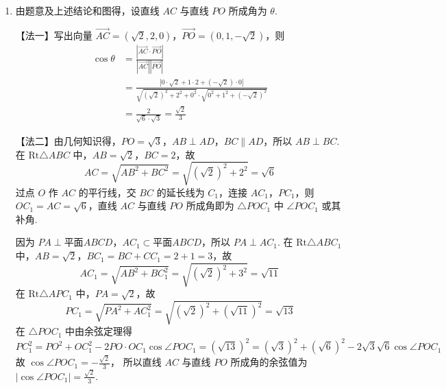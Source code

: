 \documentclass[UTF8,a4paper,oneside,11pt]{ctexbook}
\begin{document}
\begin{solution}
\begin{enumerate}
\begin{enumerate}
由几何知识得
\(O_1E = AB = \sqrt{2}\)，\(BE = CE = AO_1 = \frac{1}{2} BC = 1\)，\(O_1D = AD - AO_1 = \sqrt{3}\)，
并且
\(BO_1 = CO_1 = \sqrt{1^2 + (\sqrt{2})^2} = \sqrt{3}\)，\(O_1D = BO_1 = CO_1\)，
所以点 \(O_1\) 是 \(\triangle BCD\) 的外心.


在 \(\mathrm{Rt} \triangle AOP\) 中，\(AP \perp AD\)，\(AP = \sqrt{2}\)，故
\[
PO_1 = \sqrt{AP^2 + AO_1^2} = \sqrt{(\sqrt{2})^2 + 1^2} = \sqrt{3}
\]
从而
\[
PO_1 = BO_1 = CO_1 = O_1 D = \sqrt{3}
\]
点 \(O_1\) 即为点 \(P\)，\(B\)，\(C\)，\(D\) 所在球的球心 \(O\). 此时点 \(O\) 在线段 \(AD\) 上，且 \(AD \subset \text{平面} ABCD\)，所以点 \(O\) 在平面 \(ABCD\) 上.

\item 由题意及上述结论和图得，设直线 \(AC\) 与直线 \(PO\) 所成角为 \(\theta\).


【法一】写出向量 \(\overrightarrow{AC} = (\sqrt{2},2,0)\)，\(\overrightarrow{PO} = (0,1,-\sqrt{2})\)，则
\begin{align*}
\cos\theta
&= \frac{|\overrightarrow{AC}\cdot\overrightarrow{PO}|}{|\overrightarrow{AC}||\overrightarrow{PO}|}\\
&= \frac{|0\cdot\sqrt{2}+1\cdot 2+(-\sqrt{2})\cdot 0|}{\sqrt{(\sqrt{2})^2+2^2+0^2}\cdot \sqrt{0^2+1^2+(-\sqrt{2})^2}}\\
&= \frac{2}{\sqrt{6}\cdot\sqrt{3}}=\frac{\sqrt{2}}{3}
\end{align*}

【法二】由几何知识得，\(PO = \sqrt{3}\)，\(AB \perp AD\)，\(BC \parallel AD\)，所以 \(AB \perp BC\). 在 \(\mathrm{Rt} \triangle ABC\) 中，\(AB = \sqrt{2}\)，\(BC = 2\)，故
\[
AC = \sqrt{AB^2 + BC^2} = \sqrt{(\sqrt{2})^2 + 2^2} = \sqrt{6}
\]
过点 \(O\) 作 \(AC\) 的平行线，交 \(BC\) 的延长线为 \(C_1\)，连接 \(AC_1\)，\(PC_1\)，则 \(OC_1 = AC = \sqrt{6}\)，直线 \(AC\) 与直线 \(PO\) 所成角即为 \(\triangle POC_1\) 中 \(\angle POC_1\) 或其补角.


因为 \(PA \perp \text{平面} ABCD\)，\(AC_1 \subset \text{平面} ABCD\)，所以 \(PA \perp AC_1\). 在 \(\mathrm{Rt} \triangle ABC_1\) 中，\(AB = \sqrt{2}\)，\(BC_1 = BC + CC_1 = 2 + 1 = 3\)，故
\[
AC_1 = \sqrt{AB^2 + BC_1^2} = \sqrt{(\sqrt{2})^2 + 3^2} = \sqrt{11}
\]
在 \(\mathrm{Rt} \triangle APC_1\) 中，\(PA = \sqrt{2}\)，故
\[
PC_1 = \sqrt{PA^2 + AC_1^2} = \sqrt{(\sqrt{2})^2 + (\sqrt{11})^2} = \sqrt{13}
\]
在 \(\triangle POC_1\) 中由余弦定理得
\[
PC_1^2 = PO^2 + OC_1^2 - 2PO \cdot OC_1 \cos \angle POC_1 =(\sqrt{13})^2 = (\sqrt{3})^2 + (\sqrt{6})^2 - 2\sqrt{3}\sqrt{6}\cos \angle POC_1
\]
故
\(\cos \angle POC_1 = -\frac{\sqrt{2}}{3}\)，
所以直线 \(AC\) 与直线 \(PO\) 所成角的余弦值为
\(|\cos \angle POC_1| = \frac{\sqrt{2}}{3}\).
\end{enumerate}
\end{enumerate}
\end{solution}
\end{document}
